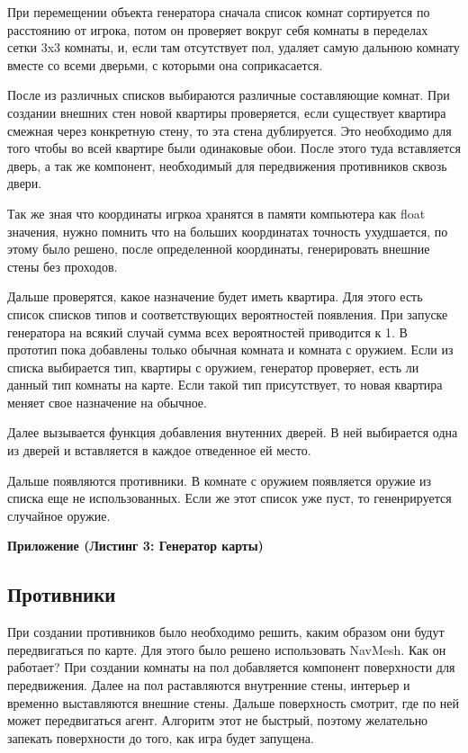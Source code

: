 \documentclass[14pt, titlepage,fleqn,a4paper]{extarticle}
\begin{document}
	При перемещении объекта генератора сначала список комнат сортируется по расстоянию от игрока, потом он проверяет вокруг себя комнаты в переделах сетки 3x3 комнаты, и, если там отсутствует пол, удаляет самую дальнюю комнату вместе со всеми дверьми, с которыми она соприкасается. 
	
	После из различных списков выбираются различные составляющие комнат. При создании внешних стен новой квартиры проверяется, если существует квартира смежная через конкретную стену, то эта стена дублируется.
	Это необходимо для того чтобы во всей квартире были одинаковые обои. После этого туда вставляется дверь, а так же компонент, необходимый для передвижения противников сквозь двери.
	
    Так же зная что координаты игркоа хранятся в памяти компьютера как float значения, нужно помнить что на больших координатах точность ухудшается, по этому было решено, после определенной координаты, генерировать внешние стены без проходов.
	
	Дальше проверятся, какое назначение будет иметь квартира. Для этого есть список списков типов и соответствующих вероятностей появления. При запуске генератора на всякий случай сумма всех вероятностей приводится к 1.
	В прототип пока добавлены только обычная комната и комната с оружием.
	Если из списка выбирается тип, квартиры с оружием, генератор проверяет, есть ли данный тип комнаты на карте. Если такой тип присутствует, то новая квартира меняет свое назначение на обычное.
	
    Далее вызывается функция добавления внутенних дверей. В ней выбирается одна из дверей и вставляется в каждое отведенное ей место. 
    
    Дальше появляются противники. В комнате с оружием появляется оружие из списка еще не использованных. Если же этот список уже пуст, то гененрируется случайное оружие.
    
    \textbf{Приложение (Листинг 3: Генератор карты)}
    
    \subsection*{Противники}
	При создании противников было необходимо решить, каким образом они будут передвигаться по карте. Для этого было решено использовать NavMesh. Как он работает? При создании комнаты на пол добавляется компонент поверхности для передвижения. Далее на пол раставляются внутренние стены, интерьер и временно выставляются внешние стены. Дальше поверхность смотрит, где по ней может передвигаться агент. Алгоритм этот не быстрый, поэтому желательно запекать поверхности до того, как игра будет запущена. 
	
\end{document}
